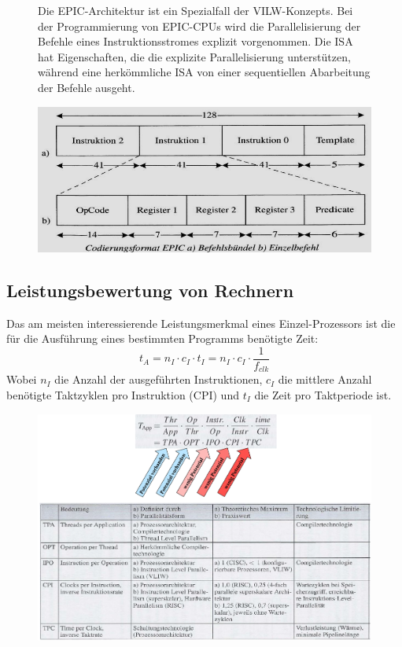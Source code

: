 \begin{figure}[htbp]
	
	\begin{minipage}{0.55\textwidth}
Die EPIC-Architektur ist ein  Spezialfall der VILW-Konzepts. Bei der Programmierung von EPIC-CPUs wird die Parallelisierung der Befehle eines Instruktionsstromes explizit vorgenommen. Die ISA hat Eigenschaften, die die explizite Parallelisierung unterstützen, während eine herkömmliche ISA von einer sequentiellen Abarbeitung der Befehle ausgeht.
		
	\end{minipage}
	\hfill		
	\begin{minipage}{0.4\textwidth} 
		\includegraphics[width=\textwidth]{images/Rechnerarchitekturen/EPIC.PNG}
	\end{minipage}
	
\end{figure}

\subsection{Leistungsbewertung von Rechnern}
Das am meisten interessierende Leistungsmerkmal eines Einzel-Prozessors ist die für die Ausführung eines bestimmten Programms benötigte Zeit:
\begin{equation*}
	t_A = n_I \cdot c_I \cdot t_I = n_I \cdot c_I \cdot \dfrac{1}{f_{clk}}
\end{equation*}
Wobei $n_I$ die Anzahl der ausgeführten Instruktionen, $c_I$ die mittlere Anzahl benötigte Taktzyklen pro Instruktion (CPI) und $t_I$ die Zeit pro Taktperiode ist.

\begin{figure}[ht]
	\includegraphics[width=8 cm]{images/Rechnerarchitekturen/Prozessorleistung.PNG}
\end{figure}